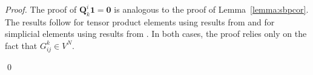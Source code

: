 \documentclass{svjour3}                     %
\renewcommand{\hat}{\widehat}
\newcommand{\diag}[1]{{\rm diag}\LRp{#1}}
\newcommand{\LRp}[1]{\left( #1 \right)}
\begin{document}
\begin{proof}
The proof of $\bm{Q}^i_k\bm{1} = \bm{0}$ is analogous to the proof of Lemma~\ref{lemma:sbpcor}.  The results follow for tensor product elements using results from \cite{kopriva2006metric} and for simplicial elements using results from \cite{chan2018discretely}.   In both cases, the proof relies only on the fact that $G^k_{ij} \in V^N$.  

\qed\end{proof}
\end{document}
